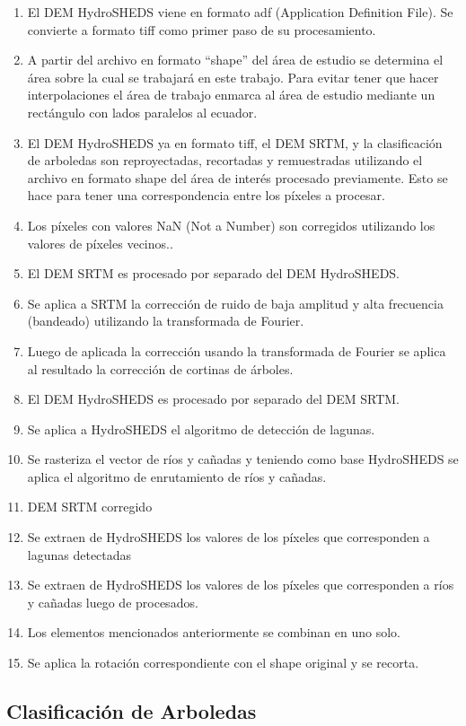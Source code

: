 \documentclass[10pt,a4paper, twoside]{report}
\begin{document}
\begin{enumerate}
	\item El DEM HydroSHEDS viene en formato adf (Application Definition File). Se convierte a formato tiff como primer paso de su procesamiento.
	\item A partir del archivo en formato "`shape"' del área de estudio se determina el área sobre la cual se trabajará en este trabajo. Para evitar tener que hacer interpolaciones el área de trabajo enmarca al área de estudio mediante un rectángulo con lados paralelos al ecuador.	
	\item El DEM HydroSHEDS ya en formato tiff, el DEM SRTM, y la clasificación de arboledas son reproyectadas, recortadas y remuestradas utilizando el archivo en formato shape del área de interés procesado previamente. Esto se hace para tener una correspondencia entre los píxeles a procesar.
	\item Los píxeles con valores NaN (Not a Number) son corregidos utilizando los valores de píxeles vecinos..
	\item El DEM SRTM es procesado por separado del DEM HydroSHEDS.
	\item Se aplica a SRTM la corrección de ruido de baja amplitud y alta frecuencia (bandeado) utilizando la transformada de Fourier.
	\item Luego de aplicada la corrección usando la transformada de Fourier se aplica al resultado la corrección de cortinas de árboles.
	\item El DEM HydroSHEDS es procesado por separado del DEM SRTM.
	\item Se aplica a HydroSHEDS el algoritmo de detección de lagunas.
	\item Se rasteriza el vector de ríos y cañadas y teniendo como base HydroSHEDS se aplica el algoritmo de enrutamiento de ríos y cañadas.
	\item DEM SRTM corregido
	\item Se extraen de HydroSHEDS los valores de los píxeles que corresponden a lagunas detectadas
	\item Se extraen de HydroSHEDS los valores de los píxeles que corresponden a ríos y cañadas luego de procesados.
	\item Los elementos mencionados anteriormente se combinan en uno solo.
	\item Se aplica la rotación correspondiente con el shape original y se recorta.	
\end{enumerate}

\subsection{Clasificación de Arboledas}
\label{clasificacionArboledas}
\end{document}
